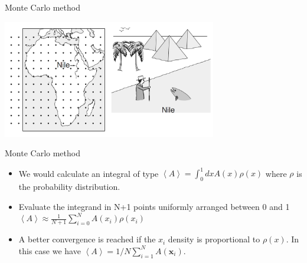 \documentclass{beamer}
\begin{document}
\begin{frame} {Monte Carlo method \cite{peliti2011statistical}}

 \begin{center}
     \includegraphics[width=0.7\textwidth]{Pic/Pic_river.png}
\end{center}

\end{frame}


\begin{frame}{Monte Carlo method \cite{peliti2011statistical}}


\begin{itemize}
\item We would calculate an integral of type $\left\langle  A\right\rangle = \int^{1}_{0} dxA(x)\rho(x)$ where $\rho$ is the probability distribution.



\item Evaluate the integrand in N+1 points uniformly arranged between 0 and 1  $\left\langle  A\right\rangle \approx \frac{1}{N+1}\sum_{i=0}^{N}A(x_{i})\rho(x_{i})$



\item A better convergence is reached if the $x_{i}$ density is proportional to $\rho(x)$.  In this case we have $\left\langle  A\right\rangle = 1/N\sum_{i=1}^{N}A(\textbf{x}_{i})$.  


\end{itemize}
\end{frame}
\end{document}
